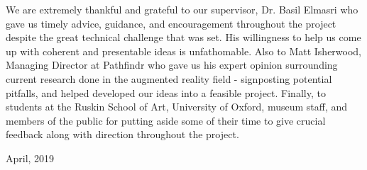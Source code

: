 
We are extremely thankful and grateful to our supervisor, Dr. Basil Elmasri who gave us timely advice, guidance, and encouragement throughout the project despite the great technical challenge that was set. His willingness to help us come up with coherent and presentable ideas is unfathomable. Also to Matt Isherwood, Managing Director at Pathfindr who gave us his expert opinion surrounding current research done in the augmented reality field - signposting potential pitfalls, and helped developed our ideas into a feasible project. Finally, to students at the Ruskin School of Art, University of Oxford, museum staff, and members of the public for putting aside some of their time to give crucial feedback along with direction throughout the project.

\begin{flushright}
April, 2019
\end{flushright}
